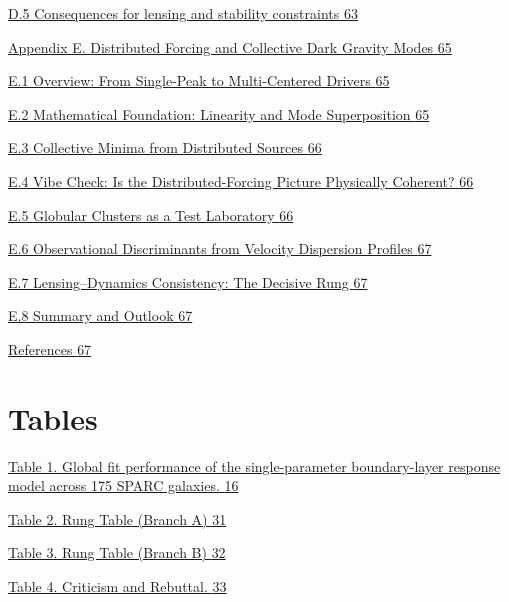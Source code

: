 \documentclass[11pt]{article}
\begin{document}
\hyperref[d.5-consequences-for-lensing-and-stability-constraints]{D.5 Consequences for lensing and stability constraints \hyperref[d.5-consequences-for-lensing-and-stability-constraints]{63}}

\hyperref[appendix-e-distributed-forcing]{Appendix E. Distributed Forcing and Collective Dark Gravity Modes \hyperref[appendix-e-distributed-forcing]{65}}

\hyperref[e.1-overview]{E.1 Overview: From Single-Peak to Multi-Centered Drivers \hyperref[e.1-overview]{65}}

\hyperref[e.2-mathematical-foundation]{E.2 Mathematical Foundation: Linearity and Mode Superposition \hyperref[e.2-mathematical-foundation]{65}}

\hyperref[e.3-collective-minima]{E.3 Collective Minima from Distributed Sources \hyperref[e.3-collective-minima]{66}}

\hyperref[e.4-vibe-check]{E.4 Vibe Check: Is the Distributed-Forcing Picture Physically Coherent? \hyperref[e.4-vibe-check]{66}}

\hyperref[e.5-globular-clusters]{E.5 Globular Clusters as a Test Laboratory \hyperref[e.5-globular-clusters]{66}}

\hyperref[e.6-observational-discriminants]{E.6 Observational Discriminants from Velocity Dispersion Profiles \hyperref[e.6-observational-discriminants]{67}}

\hyperref[e.7-lensing-dynamics-consistency]{E.7 Lensing--Dynamics Consistency: The Decisive Rung \hyperref[e.7-lensing-dynamics-consistency]{67}}

\hyperref[e.8-summary]{E.8 Summary and Outlook \hyperref[e.8-summary]{67}}

\hyperref[references]{References \hyperref[references]{67}}

\section{Tables}\label{tables}

\hyperref[_Toc222952631]{Table 1. Global fit performance of the single-parameter boundary-layer response model across 175 SPARC galaxies. \hyperref[_Toc222952631]{16}}

\hyperref[_Toc222952632]{Table 2. Rung Table (Branch A) \hyperref[_Toc222952632]{31}}

\hyperref[_Toc222952633]{Table 3. Rung Table (Branch B) \hyperref[_Toc222952633]{32}}

\hyperref[_Toc222952634]{Table 4. Criticism and Rebuttal. \hyperref[_Toc222952634]{33}}
\end{document}
